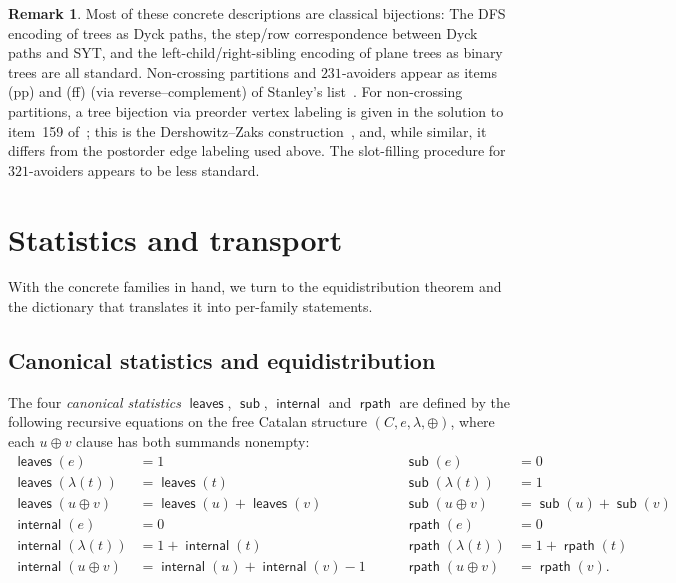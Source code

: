 \documentclass[a4paper,11pt]{article}
\theoremstyle{definition}
\newtheorem{remark}[theorem]{Remark}
\DeclareMathOperator{\rpath}{\mathsf{rpath}}
\DeclareMathOperator{\leaves}{\mathsf{leaves}}
\DeclareMathOperator{\internal}{\mathsf{internal}}
\DeclareMathOperator{\subtrees}{\mathsf{sub}}
\begin{document}
\begin{remark}
Most of these concrete descriptions are classical
bijections: The DFS encoding of trees as Dyck paths,
the step/row correspondence between Dyck paths and SYT,
and the left-child/right-sibling encoding of plane trees
as binary trees are all standard. Non-crossing partitions
and $231$-avoiders appear as items (pp) and (ff) (via
reverse--complement) of Stanley's
list~\cite[Exercise~6.19]{Stanley99}. For non-crossing
partitions, a tree bijection via preorder vertex labeling
is given in the solution to item~159
of~\cite{Stanley15}; this is the Dershowitz--Zaks
construction~\cite{DershowitzZaks86}, and, while similar,
it differs from the postorder edge labeling used above.
The slot-filling procedure for $321$-avoiders appears
to be less standard.
\end{remark}

\section{Statistics and transport}\label{sec:statistics}

With the concrete families in hand, we turn to the
equidistribution theorem and the dictionary that
translates it into per-family statements.

\subsection{Canonical statistics and
  equidistribution}\label{sec:equidistribution}

The four \emph{canonical statistics} $\leaves$, $\subtrees$, $\internal$ and
$\rpath$ are defined by the following recursive equations on the free Catalan
structure $(C, e, \lambda, \oplus)$, where each $u \oplus v$ clause has both
summands nonempty:
\[
\begin{aligned}
  \leaves(e) &= 1 \\
  \leaves(\lambda(t)) &= \leaves(t) \\
  \leaves(u \oplus v)
    &= \leaves(u) + \leaves(v) \\[4pt]
  \internal(e) &= 0 \\
  \internal(\lambda(t))
    &= 1 + \internal(t) \\
  \internal(u \oplus v)
    &= \internal(u) + \internal(v) - 1
\end{aligned}
\qquad
\begin{aligned}
  \subtrees(e) &= 0 \\
  \subtrees(\lambda(t)) &= 1 \\
  \subtrees(u \oplus v)
    &= \subtrees(u) + \subtrees(v) \\[4pt]
  \rpath(e) &= 0 \\
  \rpath(\lambda(t))
    &= 1 + \rpath(t) \\
  \rpath(u \oplus v) &= \rpath(v).
\end{aligned}
\]
\end{document}
